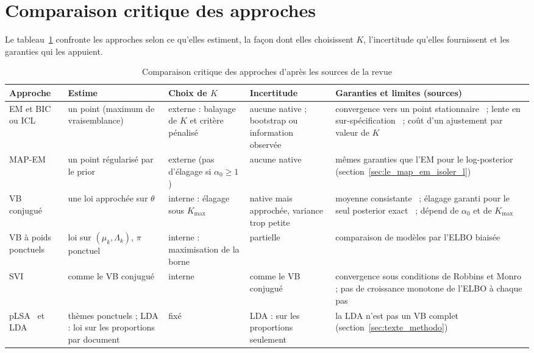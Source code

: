 \section{Comparaison critique des approches}\label{sec:ea_comparaison}
Le tableau~\ref{tab:ea_comparaison} confronte les approches selon ce qu'elles estiment, la façon dont elles choisissent $K$, l'incertitude qu'elles fournissent et les garanties qui les appuient.

\begin{table}[H]
\centering
\scriptsize
\setlength{\tabcolsep}{0.12cm}
\begin{tabular}{|>{\raggedright\arraybackslash}p{2.3cm}|>{\raggedright\arraybackslash}p{2.4cm}|>{\raggedright\arraybackslash}p{2.6cm}|>{\raggedright\arraybackslash}p{2.6cm}|>{\raggedright\arraybackslash}p{4.2cm}|}
\hline
\textbf{Approche} & \textbf{Estime} & \textbf{Choix de $K$} & \textbf{Incertitude} & \textbf{Garanties et limites (sources)} \\
\hline
EM et BIC ou ICL & un point (maximum de vraisemblance) & externe : balayage de $K$ et critère pénalisé~\cite{biernacki2000} & aucune native ; bootstrap ou information observée~\cite{louis1982,meng1991} & convergence vers un point stationnaire~\cite{wu1983} ; lente en sur-spécification~\cite{dwivedi2020} ; coût d'un ajustement par valeur de $K$ \\
\hline
MAP-EM & un point régularisé par le prior & externe (pas d'élagage si $\alpha_0 \geq 1$) & aucune native & mêmes garanties que l'EM pour le log-posterior (section~\ref{sec:le_map_em_isoler_l}) \\
\hline
VB conjugué~\cite{attias2000,bishop2006} & une loi approchée sur $\theta$ & interne : élagage sous $K_{\max}$ & native mais approchée, variance trop petite~\cite{wang2005} & moyenne consistante~\cite{wang2006} ; élagage garanti pour le seul posterior exact~\cite{rousseau2011} ; dépend de $\alpha_0$ et de $K_{\max}$ \\
\hline
VB à poids ponctuels~\cite{corduneanu2001} & loi sur $(\mu_k, \Lambda_k)$, $\pi$ ponctuel & interne : maximisation de la borne & partielle & comparaison de modèles par l'ELBO biaisée~\cite{corduneanu2001} \\
\hline
SVI~\cite{hoffman2013} & comme le VB conjugué & interne & comme le VB conjugué & convergence sous conditions de Robbins et Monro ; pas de croissance monotone de l'ELBO à chaque pas \\
\hline
pLSA~\cite{hofmann1999} et LDA~\cite{blei2003} & thèmes ponctuels ; LDA : loi sur les proportions par document & fixé & LDA : sur les proportions seulement & la LDA n'est pas un VB complet (section~\ref{sec:texte_methodo}) \\
\hline
\end{tabular}
\caption{Comparaison critique des approches d'après les sources de la revue}
\label{tab:ea_comparaison}
\end{table}

